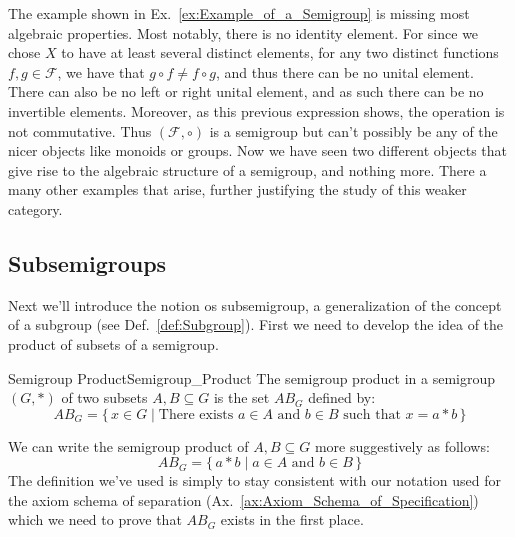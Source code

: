     The example shown in Ex.~\ref{ex:Example_of_a_Semigroup} is missing most
    algebraic properties. Most notably, there is no identity element. For since
    we chose $X$ to have at least several distinct elements, for any two
    distinct functions $f,g\in\mathscr{F}$, we have that
    $g\circ{f}\ne{f}\circ{g}$, and thus there can be no unital element. There
    can also be no left or right unital element,
    and as such there can be no invertible elements. Moreover, as this previous
    expression shows, the operation is not commutative. Thus
    $(\mathscr{F},\circ)$ is a semigroup but can't possibly be any of the nicer
    objects like monoids or groups. Now we have seen two different objects that
    give rise to the algebraic structure of a semigroup, and nothing more. There
    a many other examples that arise, further justifying the study of this
    weaker category.
    \subsection{Subsemigroups}
        Next we'll introduce the notion os subsemigroup, a generalization of the
        concept of a subgroup (see Def.~\ref{def:Subgroup}). First we need to
        develop the idea of the product of subsets of a semigroup.
        \begin{fdefinition}{Semigroup Product}{Semigroup_Product}
            The semigroup product in a semigroup $(G,*)$ of two subsets
            $A,B\subseteq{G}$ is the set $AB_{G}$ defined by:
            \begin{equation*}
                AB_{G}=\{\,x\in{G}\;|\;\textrm{There exists }a\in{A}
                    \textrm{ and }b\in{B}\textrm{ such that }x=a*b\,\}
            \end{equation*}
        \end{fdefinition}
        We can write the semigroup product of $A,B\subseteq{G}$ more
        suggestively as follows:
        \begin{equation}
            AB_{G}=\{\,a*b\;|\;a\in{A}\textrm{ and }b\in{B}\,\}
        \end{equation}
        The definition we've used is simply to stay consistent with our notation
        used for the axiom schema of separation
        (Ax.~\ref{ax:Axiom_Schema_of_Specification}) which we need to prove that
        $AB_{G}$ exists in the first place.
        \par\hfill\par
